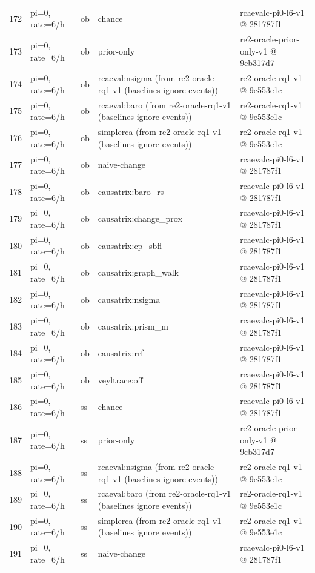\begin{longtable}{@{}r>{\raggedright\arraybackslash}p{48.0pt}>{\raggedright\arraybackslash}p{18.0pt}>{\raggedright\arraybackslash}p{108.0pt}>{\raggedright\arraybackslash}p{105.0pt}@{}}
172 & pi=0, rate=6/h & ob & chance & rcaevalc-pi0-l6-v1 @ 281787f1 \\
173 & pi=0, rate=6/h & ob & prior-only & re2-oracle-prior-only-v1 @ 9cb317d7 \\
174 & pi=0, rate=6/h & ob & rcaeval:nsigma (from re2-oracle-rq1-v1 (baselines ignore events)) & re2-oracle-rq1-v1 @ 9e553e1c \\
175 & pi=0, rate=6/h & ob & rcaeval:baro (from re2-oracle-rq1-v1 (baselines ignore events)) & re2-oracle-rq1-v1 @ 9e553e1c \\
176 & pi=0, rate=6/h & ob & simplerca (from re2-oracle-rq1-v1 (baselines ignore events)) & re2-oracle-rq1-v1 @ 9e553e1c \\
177 & pi=0, rate=6/h & ob & naive-change & rcaevalc-pi0-l6-v1 @ 281787f1 \\
178 & pi=0, rate=6/h & ob & causatrix:baro\_rs & rcaevalc-pi0-l6-v1 @ 281787f1 \\
179 & pi=0, rate=6/h & ob & causatrix:change\_prox & rcaevalc-pi0-l6-v1 @ 281787f1 \\
180 & pi=0, rate=6/h & ob & causatrix:cp\_sbfl & rcaevalc-pi0-l6-v1 @ 281787f1 \\
181 & pi=0, rate=6/h & ob & causatrix:graph\_walk & rcaevalc-pi0-l6-v1 @ 281787f1 \\
182 & pi=0, rate=6/h & ob & causatrix:nsigma & rcaevalc-pi0-l6-v1 @ 281787f1 \\
183 & pi=0, rate=6/h & ob & causatrix:prism\_m & rcaevalc-pi0-l6-v1 @ 281787f1 \\
184 & pi=0, rate=6/h & ob & causatrix:rrf & rcaevalc-pi0-l6-v1 @ 281787f1 \\
185 & pi=0, rate=6/h & ob & veyltrace:off & rcaevalc-pi0-l6-v1 @ 281787f1 \\
186 & pi=0, rate=6/h & ss & chance & rcaevalc-pi0-l6-v1 @ 281787f1 \\
187 & pi=0, rate=6/h & ss & prior-only & re2-oracle-prior-only-v1 @ 9cb317d7 \\
188 & pi=0, rate=6/h & ss & rcaeval:nsigma (from re2-oracle-rq1-v1 (baselines ignore events)) & re2-oracle-rq1-v1 @ 9e553e1c \\
189 & pi=0, rate=6/h & ss & rcaeval:baro (from re2-oracle-rq1-v1 (baselines ignore events)) & re2-oracle-rq1-v1 @ 9e553e1c \\
190 & pi=0, rate=6/h & ss & simplerca (from re2-oracle-rq1-v1 (baselines ignore events)) & re2-oracle-rq1-v1 @ 9e553e1c \\
191 & pi=0, rate=6/h & ss & naive-change & rcaevalc-pi0-l6-v1 @ 281787f1 \\

\end{longtable}
